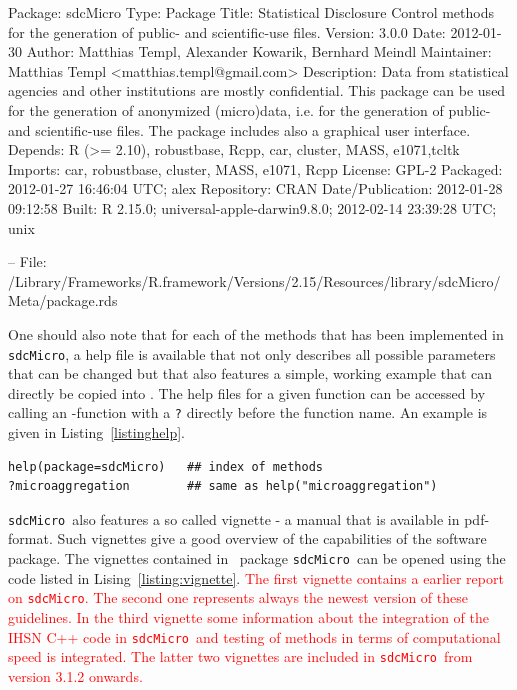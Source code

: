 \documentclass[12pt]{article}
\newcommand{\proglang}[1]{\textsf{#1}}
\newcommand{\sdcMicro}{\texttt{sdcMicro}}
\begin{document}
\begin{Schunk}
\begin{Soutput}
Package: sdcMicro
Type: Package
Title: Statistical Disclosure Control methods for the generation of
        public- and scientific-use files.
Version: 3.0.0
Date: 2012-01-30
Author: Matthias Templ, Alexander Kowarik, Bernhard Meindl
Maintainer: Matthias Templ <matthias.templ@gmail.com>
Description: Data from statistical agencies and other institutions are
        mostly confidential. This package can be used for the
        generation of anonymized (micro)data, i.e. for the generation
        of public- and scientific-use files. The package includes also
        a graphical user interface.
Depends: R (>= 2.10), robustbase, Rcpp, car, cluster, MASS, e1071,tcltk
Imports: car, robustbase, cluster, MASS, e1071, Rcpp
License: GPL-2
Packaged: 2012-01-27 16:46:04 UTC; alex
Repository: CRAN
Date/Publication: 2012-01-28 09:12:58
Built: R 2.15.0; universal-apple-darwin9.8.0; 2012-02-14 23:39:28 UTC;
        unix

-- File: /Library/Frameworks/R.framework/Versions/2.15/Resources/library/sdcMicro/Meta/package.rds 
\end{Soutput}
\end{Schunk}


One should also note that for each of the methods that has been implemented 
in \sdcMicro, a help file is available 
that not only describes all possible parameters that 
can be changed but that also features a simple, 
working example that can directly be copied into \R. The help files for a given function can be accessed by 
calling an \R-function with a \texttt{?} directly before the function name. An example is given in 
Listing~\ref{listinghelp}. 

\begin{lstlisting}[frame=single, label={listinghelp}, caption={Accessing the index of methods and the help file for function 'microaggregation' of \sdcMicro.}] 
help(package=sdcMicro)   ## index of methods
?microaggregation        ## same as help("microaggregation")
\end{lstlisting}

\sdcMicro~also features a so called vignette - a 
manual that is available in pdf-format. Such vignettes give a good overview of the capabilities 
of the software package. The vignettes contained in \R \ package \sdcMicro \ can 
be opened using the code listed in Lising~\ref{listing:vignette}. 
\textcolor{red}{
The first vignette contains a earlier report on 
\sdcMicro . The second one represents always the newest 
version of these guidelines. In the third vignette some information
about the integration of the IHSN \proglang{C++} code in \sdcMicro \ and testing of 
methods in terms of computational speed is integrated.
The latter two vignettes are included in \sdcMicro \ from version 3.1.2 onwards.}
\end{document}
